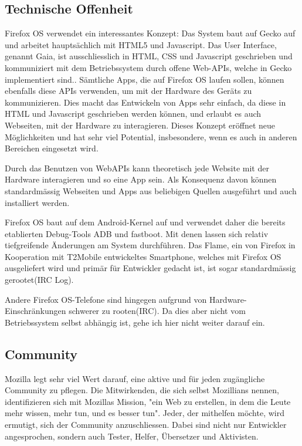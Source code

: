 \subsection{Technische Offenheit}
Firefox OS verwendet ein interessantes Konzept: Das System baut auf Gecko auf und arbeitet hauptsächlich mit HTML5 und Javascript. Das User Interface, genannt Gaia, ist ausschliesslich in HTML, CSS und Javascript geschrieben und kommuniziert mit dem Betriebssystem durch offene Web-APIs, welche in Gecko implementiert sind.\cite{online:ff-gaia}. Sämtliche Apps, die auf Firefox OS laufen sollen, können ebenfalls diese APIs verwenden, um mit der Hardware des Geräts zu kommunizieren\cite{online:ff-webapi}. Dies macht das Entwickeln von Apps sehr einfach, da diese in HTML und Javascript geschrieben werden können\cite{online:ff-apps}, und erlaubt es auch Webseiten, mit der Hardware zu interagieren. Dieses Konzept eröffnet neue Möglichkeiten und hat sehr viel Potential, insbesondere, wenn es auch in anderen Bereichen eingesetzt wird.

Durch das Benutzen von WebAPIs kann theoretisch jede Website mit der Hardware interagieren und so eine App sein. Als Konsequenz davon können standardmässig Webseiten und Apps aus beliebigen Quellen ausgeführt und auch installiert werden. 


Firefox OS baut auf dem Android-Kernel auf und verwendet daher die bereits etablierten Debug-Tools ADB und fastboot\cite{online:ff-fastboot}. Mit denen lassen sich relativ tiefgreifende Änderungen am System durchführen. Das Flame, ein von Firefox in Kooperation mit T2Mobile entwickeltes Smartphone, welches mit Firefox OS ausgeliefert wird und primär für Entwickler gedacht ist\cite{online:ff-flame}, ist sogar standardmässig gerootet(IRC Log).

Andere Firefox OS-Telefone sind hingegen aufgrund von Hardware-Einschränkungen schwerer zu rooten(IRC). Da dies aber nicht vom Betriebssystem selbst abhängig ist, gehe ich hier nicht weiter darauf ein.


\subsection{Community}
Mozilla legt sehr viel Wert darauf, eine aktive und für jeden zugängliche Community zu pflegen\cite{online:mozilla-volunteer}. Die Mitwirkenden, die sich selbst Mozillians nennen, identifizieren sich mit Mozillas Mission, "ein Web zu erstellen, in dem die Leute mehr wissen, mehr tun, und es besser tun"\cite{online:mozilla-community}. 
Jeder, der mithelfen möchte, wird ermutigt, sich der Community anzuschliessen. Dabei sind nicht nur Entwickler angesprochen, sondern auch Tester, Helfer, Übersetzer und Aktivisten\cite{online:mozilla-get-involved}. 

